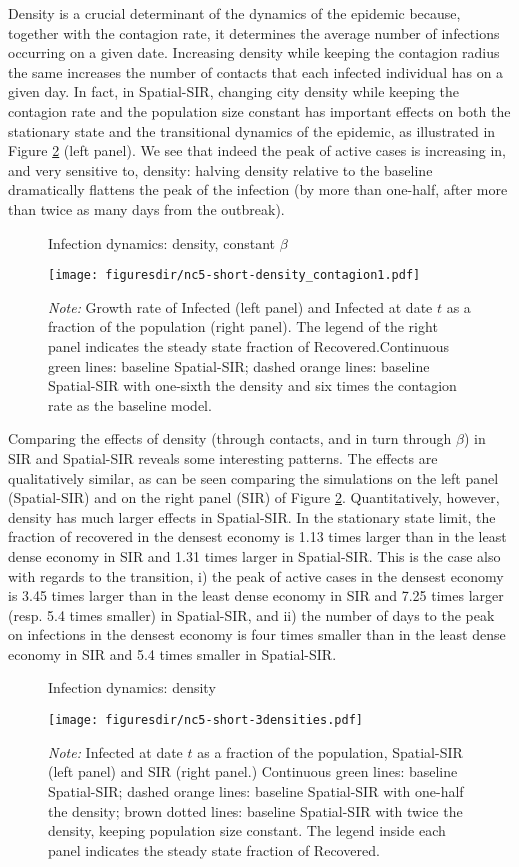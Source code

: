 \documentclass[english,11pt]{article}
\newcommand{\notegrowth}{\emph{Note:} Growth rate of Infected (left panel) and Infected at date $t$ as a fraction of the population (right panel). }
\newcommand{\notelegend}{The legend of the right panel indicates the steady state fraction of Recovered.}
\newcommand{\notelegendbis}{The legend inside each panel indicates the steady state fraction of Recovered.}
\newcommand{\notemix}[4]{\emph{Note:} Infected at date $t$ as a fraction of the population, #1 #2 #3 #4}
\begin{document}
Density is a crucial determinant of the dynamics of the epidemic because, together with the contagion
rate, it determines the average number of infections occurring on a given date. Increasing
density while keeping the contagion radius the same increases the number of contacts that each infected individual has on a given day. In fact, in Spatial-SIR, changing city density while keeping the contagion rate and the population size constant has important effects on both the stationary state and the transitional dynamics of the epidemic, as illustrated in Figure \ref{fig:3density} (left panel).  We see that indeed the peak of active cases is increasing in, and very sensitive to, density:   halving density relative to the baseline dramatically flattens the peak of the infection (by more than one-half, after more than twice as many days from the outbreak). 
\begin{figure}[t]
    \caption{Infection dynamics: density, constant $\beta$}\label{times6}
    \centering
            \texttt{[image: figuresdir/nc5-short-density\_contagion1.pdf]}
    
        \caption*{\normalfont \footnotesize 
        \notegrowth \notelegend Continuous green lines: baseline Spatial-SIR; dashed orange lines: baseline Spatial-SIR with one-sixth the density and six times the contagion rate as the baseline model.
        }
        
\end{figure}

Comparing the effects of density (through contacts, and in turn through $\beta$) in  SIR and Spatial-SIR reveals some interesting patterns. The effects are qualitatively similar, as can be seen comparing the simulations on the left panel (Spatial-SIR) and on the right panel (SIR) of Figure \ref{fig:3density}. Quantitatively, however, density has much larger effects in Spatial-SIR. In the stationary state limit, the fraction of recovered in the densest economy is 1.13 times larger than in the least dense economy in  SIR and 1.31 times larger in Spatial-SIR. This is the case also with regards to the transition, i) the peak of active cases in the densest economy is 3.45 times larger than in the least dense economy in  SIR and 7.25 times larger (resp. 5.4 times smaller) in Spatial-SIR, and ii) the number of days to the peak on infections in the densest economy is four times smaller than in the least dense economy in  SIR and 5.4 times smaller in Spatial-SIR. 

\begin{figure}[t]
    \caption{Infection dynamics: density}\label{fig:3density}
        \texttt{[image: figuresdir/nc5-short-3densities.pdf]}
    \centering
        \caption*{\normalfont \footnotesize 
        \notemix{Spatial-SIR (left panel) }{and SIR (right panel.)}{}{}  Continuous green lines: baseline Spatial-SIR; dashed orange lines: baseline Spatial-SIR with one-half the density; brown dotted lines: baseline Spatial-SIR with twice the density, keeping population size constant. \notelegendbis
        }
      
\end{figure}
\end{document}
